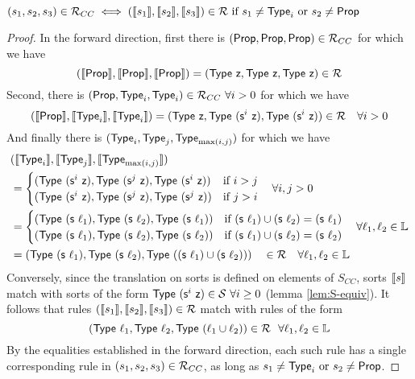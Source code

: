 \documentclass[10pt]{article}
\begin{document}
\begin{lemma}
  \label{lem:R-equiv} $(s_1,s_2,s_3) \in \mathcal{R}_{CC} \iff (\llbracket s_1 \rrbracket,\llbracket s_2 \rrbracket,\llbracket s_3 \rrbracket) \in \mathcal{R} \text{ if } s_1 \neq \textsf{Type}_i \text{ or } s_2 \neq \textsf{Prop}$
  \begin{proof}
    In the forward direction, first there is $(\textsf{Prop},\textsf{Prop},\textsf{Prop}) \in \mathcal{R}_{CC}$ for which we have
    $$(\rew{\Prop},\rew{\Prop},\rew{\Prop}) = (\Type\ \z,\Type\ \z,\Type\ \z) \in \R$$
    Second, there is $(\textsf{Prop}, \textsf{Type}_i, \textsf{Type}_i) \in \mathcal{R}_{CC}\ \forall i > 0$ for which we have
    $$(\llbracket \textsf{Prop} \rrbracket, \llbracket \textsf{Type}_i \rrbracket, \llbracket \textsf{Type}_i \rrbracket) = (\textsf{Type}\ \textsf{z}, \textsf{Type}\ (\textsf{s}^i\ \textsf{z}), \textsf{Type}\ (\textsf{s}^i\ \textsf{z})) \in \mathcal{R} \quad \forall i > 0$$
    And finally there is $(\textsf{Type}_i, \textsf{Type}_j, \textsf{Type}_{\max (i,j)})$ for which we have
    \begin{align*}
      & (\llbracket \textsf{Type}_i \rrbracket, \llbracket \textsf{Type}_j \rrbracket,  \llbracket \textsf{Type}_{\max (i,j)} \rrbracket) \\
      &=
        \begin{cases}
          (\textsf{Type}\ (\textsf{s}^i\ \textsf{z}),\textsf{Type}\ (\textsf{s}^j\ \textsf{z}),\textsf{Type}\ (\textsf{s}^i\ \textsf{z})) & \text{if } i>j \\
          (\textsf{Type}\ (\textsf{s}^i\ \textsf{z}),\textsf{Type}\ (\textsf{s}^j\ \textsf{z}),\textsf{Type}\ (\textsf{s}^j\ \textsf{z})) & \text{if } j>i
        \end{cases} \quad \forall i,j > 0 \\
      &=
        \begin{cases}
          (\textsf{Type}\ (\textsf{s}\ \ell_1), \textsf{Type}\ (\textsf{s}\ \ell_2), \textsf{Type}\ (\textsf{s}\ \ell_1)) & \text{if } (\textsf{s}\ \ell_1) \cup (\textsf{s}\ \ell_2) = (\textsf{s}\ \ell_1) \\
          (\textsf{Type}\ (\textsf{s}\ \ell_1), \textsf{Type}\ (\textsf{s}\ \ell_2), \textsf{Type}\ (\textsf{s}\ \ell_2)) & \text{if } (\textsf{s}\ \ell_1) \cup (\textsf{s}\ \ell_2) = (\textsf{s}\ \ell_2)
        \end{cases} \quad \forall \ell_1,\ell_2 \in \mathbb{L} \\
      &= (\textsf{Type}\ (\textsf{s}\ \ell_1), \textsf{Type}\ (\textsf{s}\ \ell_2), \textsf{Type}\ ((\textsf{s}\ \ell_1) \cup (\textsf{s}\ \ell_2))) \quad \in \mathcal{R} \quad \forall \ell_1,\ell_2 \in \mathbb{L}
    \end{align*}
    Conversely, since the translation on sorts is defined on elements of $S_{CC}$, sorts $\llbracket s \rrbracket$ match with sorts of the form $\textsf{Type}\ (\textsf{s}^i\ \textsf{z})\in \mathcal{S}\ \forall i \ge 0$ (lemma \ref{lem:S-equiv}). It follows that rules $(\llbracket s_1 \rrbracket,\llbracket s_2 \rrbracket,\llbracket s_3 \rrbracket) \in \mathcal{R}$ match with rules of the form $$(\textsf{Type}\ \ell_1, \textsf{Type}\ \ell_2, \textsf{Type}\ (\ell_1 \cup \ell_2)) \in \mathcal{R} ~~ \forall \ell_1,\ell_2 \in \mathbb{L}$$ By the equalities established in the forward direction, each such rule has a single corresponding rule in $(s_1,s_2,s_3) \in \mathcal{R}_{CC}$, as long as $s_1 \neq \textsf{Type}_i \text{ or } s_2 \neq \textsf{Prop}$.

  \end{proof}
\end{lemma}
\end{document}
